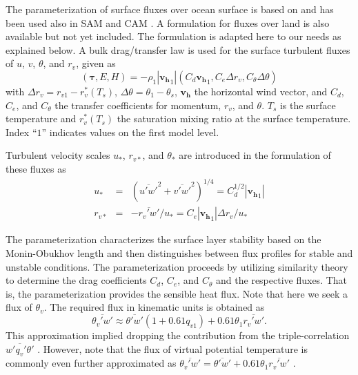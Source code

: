 \documentclass[dvipdfmx,a4paper,10pt]{article}
\begin{document}
The parameterization of surface fluxes over ocean surface is based on \cite{bryan03} and has been used also in SAM \citep{khairou03} and CAM \citep[see][section 4.10.2]{collins04}. A formulation for fluxes over land is also available but not yet included. The formulation is adapted here to our needs as explained below. A bulk drag/transfer law is used for the surface turbulent fluxes of $u$, $v$, $\theta$, and $r_v$, given as
\begin{equation}\label{eqn:fluxes}
 (\mathbf{\tau}, E, H)=-\rho_1|\mathbf{v_h}_1| (C_d \mathbf{v_h}_1, C_e \Delta r_v, C_{\theta} \Delta \theta )
\end{equation}
with $\Delta r_v=r_{v1}-r_v^*(T_s)$, $\Delta \theta=\theta_{1}-\theta_{s}$, $\mathbf{v_h}$ the horizontal wind vector, and $C_d$, $C_e$, and $C_{\theta}$ the transfer coefficients for momentum, $r_v$, and $\theta$. $T_s$ is the surface temperature and $r_v^*(T_s)$ the saturation mixing ratio at the surface temperature. Index ``$1$'' indicates values on the first model level. 

Turbulent velocity scales $u_*$, $r_{v*}$, and $\theta_{*}$ are introduced in the formulation of these fluxes as 
\begin{eqnarray}
 u_*&=& (\overline{u'w'}^2+\overline{v'w'}^2)^{1/4} = C_d^{1/2} | \mathbf{v_h}_1 |\\
 r_{v*}&=& -\overline{r_v'w'}/u_*=C_e |\mathbf{v_h}_1| \Delta r_v / u_*\label{eqn:velqv}
\end{eqnarray}

The parameterization characterizes the surface layer stability based on the Monin-Obukhov length and then distinguishes between flux profiles for stable and unstable conditions. The parameterization proceeds by utilizing similarity theory to determine the drag coefficients $C_d$, $C_e$, and $C_{\theta}$ and the respective fluxes. That is, the parameterization provides the sensible heat flux.  Note that here we seek a flux of $\theta_v$. The required flux in kinematic units is obtained as 
\begin{equation}\label{eqn:wthetav}
 \overline{\theta_v'w'}\approx \overline{\theta'w'}(1+0.61q_{v1}) + 0.61 \theta_1  \overline{r_v'w'}.
\end{equation}
This approximation implied dropping the contribution from the triple-correlation $\overline{w'q_v'\theta'}$ \citep[same as in Eq.~(10) in][]{stull94}. However, note that the flux of virtual potential temperature is commonly even further approximated as $\overline{\theta_v'w'}=\overline{\theta'w'}+0.61 \theta_1  \overline{r_v'w'}$ \citep[e.g.,][Eq.~(10.11)]{wyngaard10}. 
\end{document}

